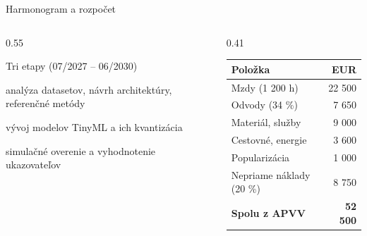 \documentclass[aspectratio=169,11pt]{beamer}
\begin{document}
\begin{frame}{Harmonogram a rozpočet}
  \begin{columns}[T]
    \begin{column}{0.55\textwidth}
      \begin{block}{Tri etapy (07/2027 -- 06/2030)}
        \begin{description}[07/2029]
          \item[07/2027] analýza datasetov, návrh architektúry, referenčné metódy
          \item[07/2028] vývoj modelov TinyML a ich kvantizácia
          \item[07/2029] simulačné overenie a vyhodnotenie ukazovateľov
        \end{description}
      \end{block}
    \end{column}
    \begin{column}{0.41\textwidth}
      \small
      \begin{tabularx}{\textwidth}{@{}X r@{}}
        \toprule
        \textbf{Položka} & \textbf{EUR} \\
        \midrule
        Mzdy (1 200 h) & 22 500 \\
        Odvody (34 \%) & 7 650 \\
        Materiál, služby & 9 000 \\
        Cestovné, energie & 3 600 \\
        Popularizácia & 1 000 \\
        Nepriame náklady (20 \%) & 8 750 \\
        \midrule
        \textbf{Spolu z APVV} & \textbf{52 500} \\
        \bottomrule
      \end{tabularx}
    \end{column}
  \end{columns}
\end{frame}
\end{document}
